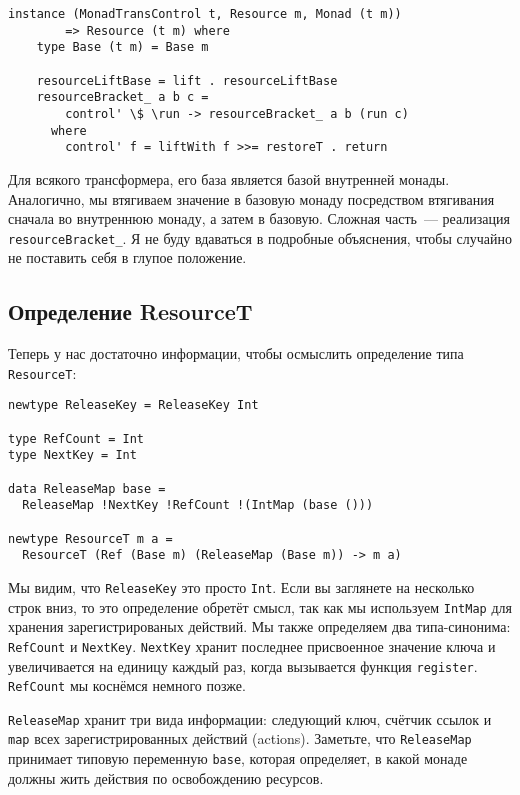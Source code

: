 \begin{lstlisting}
instance (MonadTransControl t, Resource m, Monad (t m))
        => Resource (t m) where
    type Base (t m) = Base m

    resourceLiftBase = lift . resourceLiftBase
    resourceBracket_ a b c =
        control' \$ \run -> resourceBracket_ a b (run c)
      where
        control' f = liftWith f >>= restoreT . return 
\end{lstlisting}

Для всякого трансформера, его база является базой внутренней монады. Аналогично, мы втягиваем значение в базовую монаду посредством втягивания сначала во внутреннюю монаду, а затем в базовую.
Сложная часть~--- реализация \verb=resourceBracket_=. Я не буду вдаваться в подробные
объяснения, чтобы случайно не поставить себя в глупое положение.

\subsection{Определение ResourceT}

Теперь у нас достаточно информации, чтобы осмыслить определение типа
\lstinline'ResourceT':
\begin{lstlisting}
newtype ReleaseKey = ReleaseKey Int

type RefCount = Int
type NextKey = Int

data ReleaseMap base =
  ReleaseMap !NextKey !RefCount !(IntMap (base ()))

newtype ResourceT m a =
  ResourceT (Ref (Base m) (ReleaseMap (Base m)) -> m a)
\end{lstlisting}

Мы видим, что \lstinline'ReleaseKey' это просто \lstinline'Int'. Если вы заглянете на
несколько строк вниз, то
это определение обретёт смысл, так как мы используем \lstinline'IntMap' для хранения
зарегистрированых действий. Мы также определяем два типа-синонима: \lstinline'RefCount' и
\lstinline'NextKey'. \lstinline'NextKey'
хранит последнее присвоенное значение ключа и увеличивается на единицу каждый раз, когда
вызывается функция \verb=register=. \lstinline{RefCount} мы коснёмся немного позже.

\lstinline'ReleaseMap' хранит три вида информации: следующий ключ, счётчик ссылок и
\lstinline'map' всех
зарегистрированных действий (actions). Заметьте, что \lstinline'ReleaseMap' принимает
типовую переменную \lstinline'base', которая определяет, в какой монаде должны жить действия по освобождению ресурсов.

